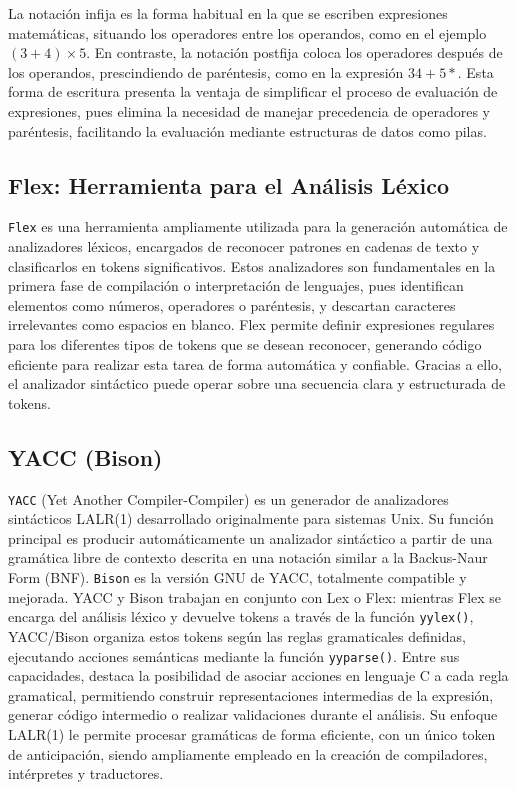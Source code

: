 \documentclass{article}
\begin{document}
La notación infija es la forma habitual en la que se escriben expresiones matemáticas, situando los operadores entre los operandos, como en el ejemplo $(3+4) \times 5$. En contraste, la notación postfija coloca los operadores después de los operandos, prescindiendo de paréntesis, como en la expresión $34+5*$. Esta forma de escritura presenta la ventaja de simplificar el proceso de evaluación de expresiones, pues elimina la necesidad de manejar precedencia de operadores y paréntesis, facilitando la evaluación mediante estructuras de datos como pilas.

\subsection*{Flex: Herramienta para el Análisis Léxico}

\texttt{Flex} es una herramienta ampliamente utilizada para la generación automática de analizadores léxicos, encargados de reconocer patrones en cadenas de texto y clasificarlos en tokens significativos. Estos analizadores son fundamentales en la primera fase de compilación o interpretación de lenguajes, pues identifican elementos como números, operadores o paréntesis, y descartan caracteres irrelevantes como espacios en blanco.  
Flex permite definir expresiones regulares para los diferentes tipos de tokens que se desean reconocer, generando código eficiente para realizar esta tarea de forma automática y confiable. Gracias a ello, el analizador sintáctico puede operar sobre una secuencia clara y estructurada de tokens.

\subsection*{YACC (Bison)}

\texttt{YACC} (Yet Another Compiler-Compiler) es un generador de analizadores sintácticos LALR(1) desarrollado originalmente para sistemas Unix. Su función principal es producir automáticamente un analizador sintáctico a partir de una gramática libre de contexto descrita en una notación similar a la Backus-Naur Form (BNF).  
\texttt{Bison} es la versión GNU de YACC, totalmente compatible y mejorada. YACC y Bison trabajan en conjunto con Lex o Flex: mientras Flex se encarga del análisis léxico y devuelve tokens a través de la función \texttt{yylex()}, YACC/Bison organiza estos tokens según las reglas gramaticales definidas, ejecutando acciones semánticas mediante la función \texttt{yyparse()}.  
Entre sus capacidades, destaca la posibilidad de asociar acciones en lenguaje C a cada regla gramatical, permitiendo construir representaciones intermedias de la expresión, generar código intermedio o realizar validaciones durante el análisis. Su enfoque LALR(1) le permite procesar gramáticas de forma eficiente, con un único token de anticipación, siendo ampliamente empleado en la creación de compiladores, intérpretes y traductores.
\end{document}
